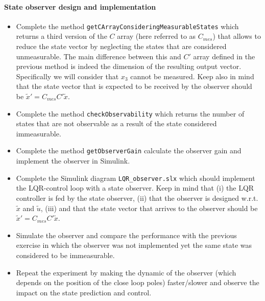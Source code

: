 	\paragraph{State observer design and implementation}
	\begin{itemize}
		\item Complete the method \texttt{getCArrayConsideringMeasurableStates} which returns a third version of the $C$ array (here referred to as $C_{mes}$) that allows to reduce the state vector by neglecting the states that are considered unmeasurable. 
		The main difference between this and $C'$ array defined in the previous method is indeed the dimension of the resulting output vector. 
		Specifically we will consider that $x_3$ cannot be measured.
		Keep also in mind that the state vector that is expected to be received by the observer should be $\tilde{x}' = C_{mes} C' \tilde{x}$.
		\item Complete the method \texttt{checkObservability} which returns the number of states that are not observable as a result of the state considered immeasurable. 
		\item Complete the method \texttt{getObserverGain} calculate the observer gain and implement the observer in Simulink. 
		\item Complete the Simulink diagram \texttt{LQR\_observer.slx} which should implement the LQR-control loop with a state observer. 
		Keep in mind that (i) the LQR controller is fed by the state observer, (ii) that the observer is designed w.r.t. $\tilde{x}$ and $\tilde{u}$, (iii) and that the state vector that arrives to the observer should be $\tilde{x}' = C_{mes} C' \tilde{x}$.
		\item Simulate the observer and compare the performance with the previous exercise in which the observer was not implemented yet the same state was considered to be immeasurable. 
		\item Repeat the experiment by making the dynamic of the observer (which depends on the position of the close loop poles) faster/slower and observe the impact on the state prediction and control. 
	\end{itemize} 